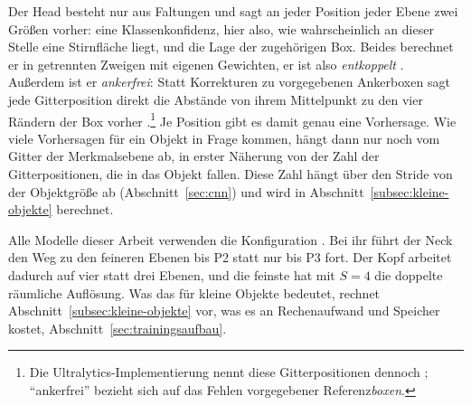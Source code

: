 Der Head besteht nur aus Faltungen und sagt an jeder Position jeder Ebene zwei
Größen vorher: eine Klassenkonfidenz, hier also, wie wahrscheinlich an dieser
Stelle eine Stirnfläche liegt, und die Lage der zugehörigen Box. Beides
berechnet er in getrennten Zweigen mit eigenen Gewichten, er ist also
\emph{entkoppelt} \parencite{ge2021yolox}. Außerdem ist er \emph{ankerfrei}:
Statt Korrekturen zu vorgegebenen Ankerboxen sagt jede Gitterposition direkt die
Abstände von ihrem Mittelpunkt zu den vier Rändern der Box vorher
\parencite{tian2019fcos}.\footnote{Die Ultralytics-Implementierung nennt diese
Gitterpositionen dennoch ; \enquote{ankerfrei} bezieht sich
auf das Fehlen vorgegebener Referenz\emph{boxen}.} Je Position gibt es damit
genau eine Vorhersage. Wie viele Vorhersagen für ein Objekt in Frage kommen,
hängt dann nur noch vom Gitter der Merkmalsebene ab, in erster Näherung von der
Zahl der Gitterpositionen, die in das Objekt fallen. Diese Zahl hängt über den
Stride von der Objektgröße ab (Abschnitt~\ref{sec:cnn}) und wird in
Abschnitt~\ref{subsec:kleine-objekte} berechnet.

\label{sec:p2kopf} Alle Modelle dieser Arbeit verwenden
die Konfiguration . Bei ihr führt der Neck den Weg zu den
feineren Ebenen bis P2 statt nur bis P3 fort. Der Kopf arbeitet dadurch auf
vier statt drei Ebenen, und die feinste hat mit $S=4$ die doppelte räumliche
Auflösung. Was das für kleine Objekte bedeutet, rechnet
Abschnitt~\ref{subsec:kleine-objekte} vor, was es an Rechenaufwand und Speicher
kostet, Abschnitt~\ref{sec:trainingsaufbau}.

